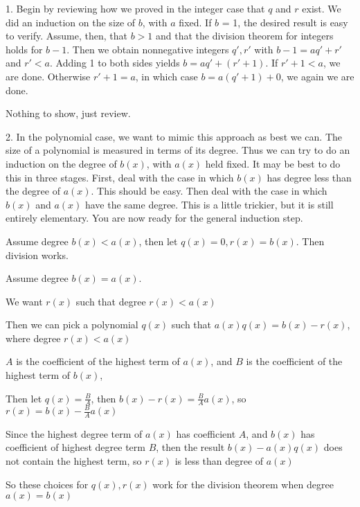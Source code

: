 \documentclass[12pt]{article}
\begin{document}
\begin{itemize}
	1. Begin by reviewing how we proved in the integer case that $q$ and $r$ exist. 
	We did an induction on the size of $b$, with $a$ fixed. 
	If $b$ = 1, the desired result is easy to verify. 
	Assume, then, that $b> 1$ and that the division theorem for integers holds for $b-1$. 
	Then we obtain nonnegative integers $q', r'$ with $b-1 = aq' + r'$ and $r' < a$. 
	Adding 1 to both sides yields $b = aq' + (r' + 1)$. If $r' + 1 < a$, we are done. 
	Otherwise $r' + 1 = a$, in which case $b = a(q' + 1) + 0$, we again we are done.

	Nothing to show, just review.

	2. In the polynomial case, we want to mimic this approach as best we can. 
	The size of a polynomial is measured in terms of its degree. 
	Thus we can try to do an induction on the degree of $b(x)$, with $a(x)$ held fixed. 
	It may be best to do this in three stages. 
	First, deal with the case in which $b(x)$ has degree less than the degree of $a(x)$. 
	This should be easy. Then deal with the case in which $b(x)$ and $a(x)$ have the same degree. 
	This is a little trickier, but it is still entirely elementary. 
	You are now ready for the general induction step.

	Assume degree $b(x) < a(x)$, then let $q(x) = 0, r(x) = b(x)$. Then division works.

	Assume degree $b(x) = a(x)$. 

	We want $r(x)$ such that degree $r(x) < a(x)$

	Then we can pick a polynomial $q(x)$ such that $a(x)q(x) = b(x) - r(x)$, 
	where degree $r(x) < a(x)$ 

	$A$ is the coefficient of the highest term of $a(x)$, and $B$ is
	the coefficient of the highest term of $b(x)$,

	Then let $q(x) = \frac{B}{A}$, then $b(x) - r(x) = \frac{B}{A} a(x)$,
	so $r(x) = b(x) - \frac{B}{A} a(x)$

	Since the highest degree term of $a(x)$ has coefficient $A$, and
	$b(x)$ has coefficient of highest degree term $B$,
	then the result $b(x) - a(x)q(x)$ does not contain the highest term,
	so $r(x)$ is less than degree of $a(x)$

	So these choices for $q(x), r(x)$ work for the division theorem when degree $a(x) = b(x)$


\end{itemize}
\end{document}
